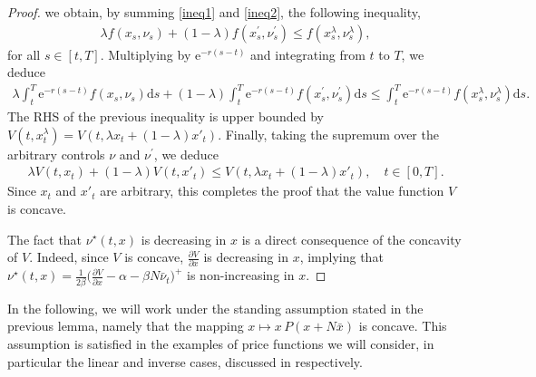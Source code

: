 \documentclass[12pt]{article}
\def\erm{\mathrm{e}}
\def\drm{\mathrm{d}}
\begin{document}
\begin{proof}
we obtain, by summing \eqref{ineq1} and \eqref{ineq2}, the following inequality, 
\begin{align*}
    \lambda f(x_s, \nu_s) + (1-\lambda) f(x^\prime_s, \nu^\prime_s)
    \leq f(x^\lambda_s, \nu^\lambda_s),
\end{align*}
for all $s \in [t,T]$. Multiplying by $\erm^{-r(s-t)}$ and integrating from $t$ to $T$, we deduce
\begin{align*}
    \lambda \int_t^T \erm^{-r(s-t)}  f(x_s, \nu_s) \drm s
    + (1-\lambda) \int_t^T \erm^{-r(s-t)}  f(x^\prime_s, \nu^\prime_s) \drm s
    \leq \int_t^T \erm^{-r(s-t)} f(x^\lambda_s, \nu^\lambda_s) \drm s.
\end{align*}
The RHS of the previous inequality is upper bounded by $V(t,x_t^\lambda) = V(t,\lambda x_t+(1-\lambda)x'_t)$. Finally, taking the supremum over the arbitrary controls $\nu$ and $\nu^\prime$, we deduce
\begin{align*}
    \lambda V(t,x_t)+(1-\lambda)V(t,x'_t) \leq V(t,\lambda x_t+(1-\lambda)x'_t), \quad t \in [0,T].
\end{align*}
Since \(x_t\) and \(x'_t\) are arbitrary, this completes the proof that the value function \(V\) is concave.


The fact that $\nu^\star(t,x)$ is decreasing in $x$ is a direct consequence of the concavity of $V$. Indeed, since $V$ is concave, $\frac{\partial V}{ \partial x}$ is decreasing in $x$, implying that $\nu^\star(t,x)=\frac{1}{2\beta}\big( \frac{\partial V}{\partial x}-\alpha-\beta N\bar{\nu}_t \big)^+$ is non-increasing in $x$.
\end{proof}



In the following, we will work under the standing assumption stated in the previous lemma, namely that the mapping \(x \longmapsto x\,P(x + N\bar{x})\) is concave. This assumption is 
satisfied in 
the examples of price functions we will consider, in particular the linear and inverse cases, discussed in  respectively.
\end{document}
